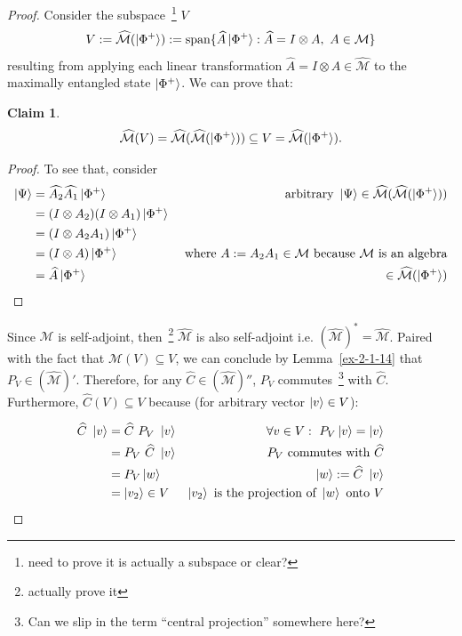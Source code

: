 \documentclass[12pt]{article}
\theoremstyle{plain}
\newtheorem{claim}[theorem]{Claim}
\begin{document}
\begin{proof}
Consider the subspace~\footnote{need to prove it is actually a subspace or clear?} $V$ 
\begin{equation}
 V := \widehat{\mathcal{M}}(\ket{\Phi^+}) := \text{span} \{ \widehat{A}\ket{\Phi^+}: \widehat{A} = I \otimes A, \ A \in \mathcal{M}  \}   
\end{equation}
resulting from applying each linear transformation $\widehat{A} = I \otimes A \in \widehat{\mathcal{M}}$ to the maximally entangled state $\ket{\Phi^+}$. We can prove that:
\begin{claim}
    \[\widehat{\mathcal{M}}(V)  = \widehat{\mathcal{M}}(\widehat{\mathcal{M}}(\ket{\Phi^+}))\subseteq V = \widehat{\mathcal{M}}(\ket{\Phi^+}).\]
\end{claim}
\begin{proof}
To see that, consider
\begin{align*}
    \ket{\Psi} &= \widehat{A_2} \widehat{A_1} \ket{\Phi^+} & \text{ arbitrary } \ket{\Psi} \in \widehat{\mathcal{M}}(\widehat{\mathcal{M}}(\ket{\Phi^+}))\\
    &= (I \otimes A_2)(I \otimes A_1) \ket{\Phi^+}\\
    &= (I \otimes A_2 A_1) \ket{\Phi^+}\\
    &= (I \otimes A) \ket{\Phi^+} & \text{ where } A := A_2 A_1 \in \mathcal{M} \text{ because } \mathcal{M} \text{ is an algebra}\\
    &= \widehat{A} \ket{\Phi^+} & \in \widehat{\mathcal{M}}(\ket{\Phi^+})
\end{align*}
\end{proof}

Since $\mathcal{M}$ is self-adjoint, then~\footnote{actually prove it} $\widehat{\mathcal{M}}$ is also self-adjoint i.e. $(\widehat{\mathcal{M}})^* = \widehat{\mathcal{M}}$. Paired with the fact that $\widehat{\mathcal{M}}(V) \subseteq V$, we can conclude by Lemma~\ref{ex-2-1-14} that $P_V \in (\widehat{\mathcal{M}})'$. Therefore, for any $\widehat{C} \in (\widehat{\mathcal{M}})''$, $P_V$ commutes~\footnote{Can we slip in the term ``central projection'' somewhere here?} with $\widehat{C}$. Furthermore, $\widehat{C}(V) \subseteq V$ because (for arbitrary vector $\ket{v} \in V$):

\begin{align*}
    \widehat{C}\ \ket{v} & =   \widehat{C} \ P_V\ \ket{v} &\forall v \in V:\ P_V \ket{v} = \ket{v} \\
    &= P_V \ \widehat{C} \ \ket{v} &  P_V \text{ commutes with } \widehat{C} \\
    &= P_V \ket{w} & \ket{w} := \widehat{C} \ \ket{v}\\
    &= \ket{v_2} \in V & \ket{v_2} \text{ is the projection of } \ket{w} \text{ onto } V\\
\end{align*}


\end{proof}
\end{document}
